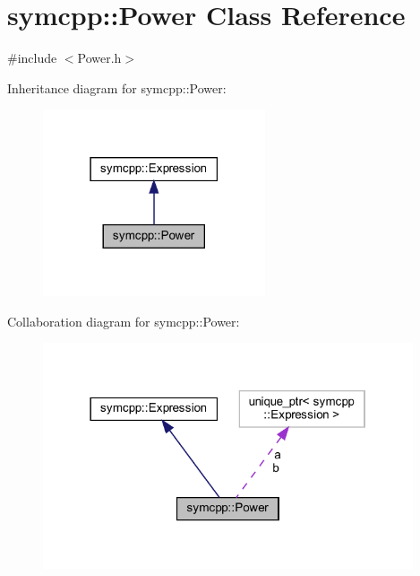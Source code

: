 \hypertarget{classsymcpp_1_1Power}{}\section{symcpp\+::Power Class Reference}
\label{classsymcpp_1_1Power}


{\ttfamily \#include $<$Power.\+h$>$}



Inheritance diagram for symcpp\+::Power\+:
\nopagebreak
\begin{figure}[H]
\begin{center}
\leavevmode
\includegraphics[width=186pt]{classsymcpp_1_1Power__inherit__graph}
\end{center}
\end{figure}


Collaboration diagram for symcpp\+::Power\+:
\nopagebreak
\begin{figure}[H]
\begin{center}
\leavevmode
\includegraphics[width=310pt]{classsymcpp_1_1Power__coll__graph}
\end{center}
\end{figure}

